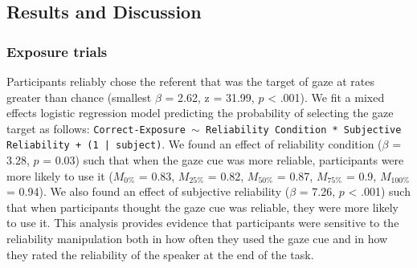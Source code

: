\documentclass[oneside]{report}
\begin{document}
\subsection{Results and Discussion}\label{results-and-discussion-2}

\subsubsection{Exposure trials}\label{exposure-trials-2}

Participants reliably chose the referent that was the target of gaze at
rates greater than chance (smallest \(\beta\) = 2.62, z = 31.99, \(p\)
\textless{} .001). We fit a mixed effects logistic regression model
predicting the probability of selecting the gaze target as follows:
\texttt{Correct-Exposure $\sim$ Reliability Condition * Subjective Reliability + (1 | subject)}.
We found an effect of reliability condition (\(\beta\) = 3.28, \(p\) =
0.03) such that when the gaze cue was more reliable, participants were
more likely to use it (\(M_{0\%}\) = 0.83, \(M_{25\%}\) = 0.82,
\(M_{50\%}\) = 0.87, \(M_{75\%}\) = 0.9, \(M_{100\%}\) = 0.94). We also
found an effect of subjective reliability (\(\beta\) = 7.26, \(p\)
\textless{} .001) such that when participants thought the gaze cue was
reliable, they were more likely to use it. This analysis provides
evidence that participants were sensitive to the reliability
manipulation both in how often they used the gaze cue and in how they
rated the reliability of the speaker at the end of the task.
\end{document}

